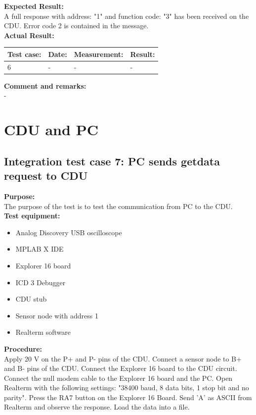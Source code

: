 \textbf{Expected Result:}\\
A full response with address: "1" and function code: "3" has been received on the CDU. Error code 2 is contained in the message.\\

\textbf{Actual Result:}\\
\begin{table}[H]
\centering
\begin{tabular}{|p{2cm}|p{2cm}|p{3cm}|p{2cm}|}\hline
\textbf{Test case:} & \textbf{Date:} & \textbf{Measurement:} & \textbf{Result:} \\ \hline
6 & - & - & - \\ \hline
\end{tabular}
\end{table}


\textbf{Comment and remarks:}\\
-\\


\section{CDU and PC}
\subsection{Integration test case 7: PC sends getdata request to CDU}
\textbf{Purpose:}\\
The purpose of the test is to test the communication from PC to the CDU.\\

\textbf{Test equipment:}
\begin{itemize}
\item Analog Discovery USB oscilloscope
\item MPLAB X IDE
\item Explorer 16 board
\item ICD 3 Debugger
\item CDU stub
\item Sensor node with address 1
\item Realterm software
\end{itemize}

\textbf{Procedure:}\\
Apply 20 V on the P+ and P- pins of the CDU. Connect a sensor node to B+ and B- pins of the CDU. Connect the Explorer 16 board to the CDU circuit. Connect the null modem cable to the Explorer 16 board and the PC. Open Realterm with the following settings: "38400 baud, 8 data bits, 1 stop bit and no parity". Press the RA7 button on the Explorer 16 Board. Send 'A' as ASCII from Realterm and observe the response. Load the data into a file.\\

